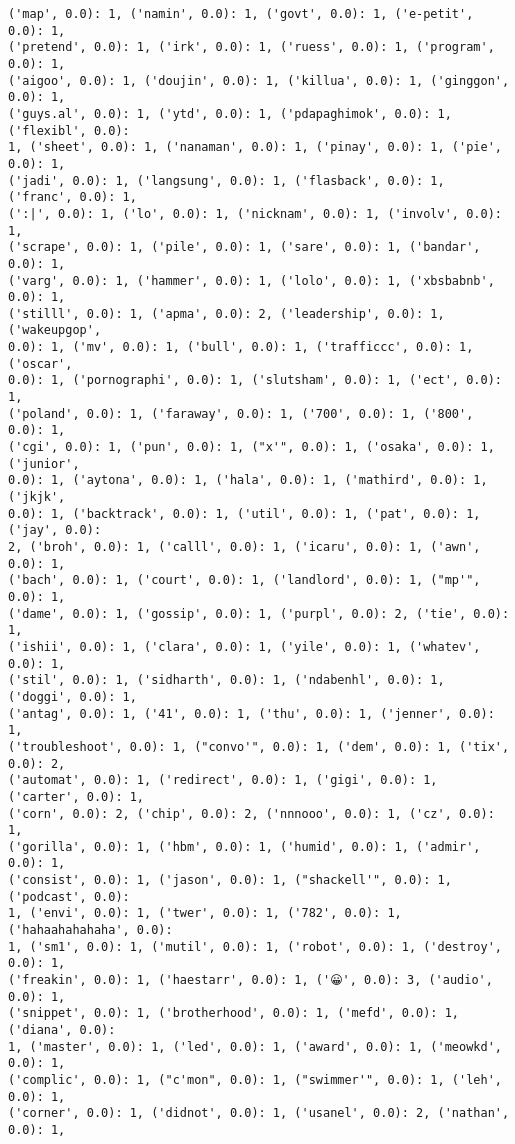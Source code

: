\documentclass[11pt]{article}
\begin{document}
\begin{Verbatim}[commandchars=\\\{\}]
('map', 0.0): 1, ('namin', 0.0): 1, ('govt', 0.0): 1, ('e-petit', 0.0): 1,
('pretend', 0.0): 1, ('irk', 0.0): 1, ('ruess', 0.0): 1, ('program', 0.0): 1,
('aigoo', 0.0): 1, ('doujin', 0.0): 1, ('killua', 0.0): 1, ('ginggon', 0.0): 1,
('guys.al', 0.0): 1, ('ytd', 0.0): 1, ('pdapaghimok', 0.0): 1, ('flexibl', 0.0):
1, ('sheet', 0.0): 1, ('nanaman', 0.0): 1, ('pinay', 0.0): 1, ('pie', 0.0): 1,
('jadi', 0.0): 1, ('langsung', 0.0): 1, ('flasback', 0.0): 1, ('franc', 0.0): 1,
(':|', 0.0): 1, ('lo', 0.0): 1, ('nicknam', 0.0): 1, ('involv', 0.0): 1,
('scrape', 0.0): 1, ('pile', 0.0): 1, ('sare', 0.0): 1, ('bandar', 0.0): 1,
('varg', 0.0): 1, ('hammer', 0.0): 1, ('lolo', 0.0): 1, ('xbsbabnb', 0.0): 1,
('stilll', 0.0): 1, ('apma', 0.0): 2, ('leadership', 0.0): 1, ('wakeupgop',
0.0): 1, ('mv', 0.0): 1, ('bull', 0.0): 1, ('trafficcc', 0.0): 1, ('oscar',
0.0): 1, ('pornographi', 0.0): 1, ('slutsham', 0.0): 1, ('ect', 0.0): 1,
('poland', 0.0): 1, ('faraway', 0.0): 1, ('700', 0.0): 1, ('800', 0.0): 1,
('cgi', 0.0): 1, ('pun', 0.0): 1, ("x'", 0.0): 1, ('osaka', 0.0): 1, ('junior',
0.0): 1, ('aytona', 0.0): 1, ('hala', 0.0): 1, ('mathird', 0.0): 1, ('jkjk',
0.0): 1, ('backtrack', 0.0): 1, ('util', 0.0): 1, ('pat', 0.0): 1, ('jay', 0.0):
2, ('broh', 0.0): 1, ('calll', 0.0): 1, ('icaru', 0.0): 1, ('awn', 0.0): 1,
('bach', 0.0): 1, ('court', 0.0): 1, ('landlord', 0.0): 1, ("mp'", 0.0): 1,
('dame', 0.0): 1, ('gossip', 0.0): 1, ('purpl', 0.0): 2, ('tie', 0.0): 1,
('ishii', 0.0): 1, ('clara', 0.0): 1, ('yile', 0.0): 1, ('whatev', 0.0): 1,
('stil', 0.0): 1, ('sidharth', 0.0): 1, ('ndabenhl', 0.0): 1, ('doggi', 0.0): 1,
('antag', 0.0): 1, ('41', 0.0): 1, ('thu', 0.0): 1, ('jenner', 0.0): 1,
('troubleshoot', 0.0): 1, ("convo'", 0.0): 1, ('dem', 0.0): 1, ('tix', 0.0): 2,
('automat', 0.0): 1, ('redirect', 0.0): 1, ('gigi', 0.0): 1, ('carter', 0.0): 1,
('corn', 0.0): 2, ('chip', 0.0): 2, ('nnnooo', 0.0): 1, ('cz', 0.0): 1,
('gorilla', 0.0): 1, ('hbm', 0.0): 1, ('humid', 0.0): 1, ('admir', 0.0): 1,
('consist', 0.0): 1, ('jason', 0.0): 1, ("shackell'", 0.0): 1, ('podcast', 0.0):
1, ('envi', 0.0): 1, ('twer', 0.0): 1, ('782', 0.0): 1, ('hahaahahahaha', 0.0):
1, ('sm1', 0.0): 1, ('mutil', 0.0): 1, ('robot', 0.0): 1, ('destroy', 0.0): 1,
('freakin', 0.0): 1, ('haestarr', 0.0): 1, ('😀', 0.0): 3, ('audio', 0.0): 1,
('snippet', 0.0): 1, ('brotherhood', 0.0): 1, ('mefd', 0.0): 1, ('diana', 0.0):
1, ('master', 0.0): 1, ('led', 0.0): 1, ('award', 0.0): 1, ('meowkd', 0.0): 1,
('complic', 0.0): 1, ("c'mon", 0.0): 1, ("swimmer'", 0.0): 1, ('leh', 0.0): 1,
('corner', 0.0): 1, ('didnot', 0.0): 1, ('usanel', 0.0): 2, ('nathan', 0.0): 1,

\end{Verbatim}
\end{document}
